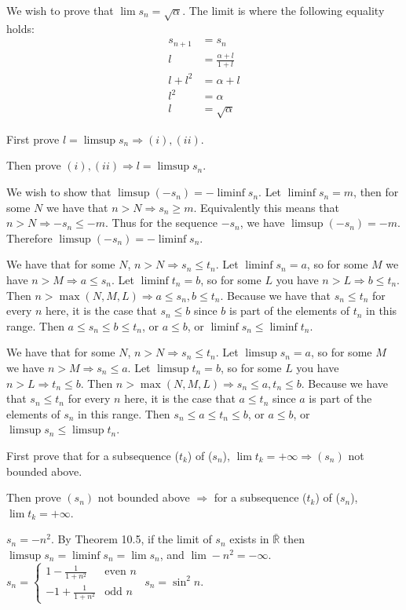 \documentclass{homework}
\begin{document}
\begin{alphaparts}
\questionpart We wish to prove that $\lim s_n = \sqrt{\alpha}$. The limit is where the following equality holds:
\begin{align*}
	s_{n+1} &=  s_n \\
	l       &=  \frac{\alpha + l}{1 + l}    \\
	l + l^2 &=  \alpha + l  \\
	l^2     &=  \alpha  \\
	l   &=  \sqrt{\alpha}
\end{align*}
\end{alphaparts}


\question
First prove $l = \limsup s_n \Rightarrow (i), (ii)$.

Then prove $(i), (ii) \Rightarrow l = \limsup s_n$.

\question
We wish to show that $\limsup (-s_n) = -\liminf s_n$. Let $\liminf s_n = m$, then for some $N$ we have that $n > N \Rightarrow s_n \ge m$. Equivalently this means that $n > N \Rightarrow -s_n \le -m$. Thus for the sequence $-s_n$, we have $\limsup (-s_n) = -m$. Therefore $\limsup (-s_n) = -\liminf s_n$.


\question
We have that for some $N$, $n > N \Rightarrow s_n \le t_n$. Let $\liminf s_n = a$, so for some $M$ we have $n > M \Rightarrow a \le s_n$. Let $\liminf t_n = b$, so for some $L$ you have $n > L \Rightarrow b \le t_n$. Then $n > \max(N, M, L) \Rightarrow a \le s_n, b \le t_n$. Because we have that $s_n \le t_n$ for every $n$ here, it is the case that $s_n \le b$ since $b$ is part of the elements of $t_n$ in this range. Then $a \le s_n \le b \le t_n$, or $a \le b$, or $\liminf s_n \le \liminf t_n$.

We have that for some $N$, $n > N \Rightarrow s_n \le t_n$. Let $\limsup s_n = a$, so for some $M$ we have $n > M \Rightarrow s_n \le a$. Let $\limsup t_n = b$, so for some $L$ you have $n > L \Rightarrow t_n \le b$. Then $n > \max(N, M, L) \Rightarrow s_n \le a, t_n \le b$. Because we have that $s_n \le t_n$ for every $n$ here, it is the case that $a \le t_n$ since $a$ is part of the elements of $s_n$ in this range. Then $s_n \le a \le t_n \le b$, or $a \le b$, or $\limsup s_n \le \limsup t_n$.


\question
First prove that for a subsequence ($t_k$) of ($s_n$), $\lim t_k = +\infty \Rightarrow (s_n)$ not bounded above.

Then prove $(s_n)$ not bounded above $\Rightarrow$ for a subsequence ($t_k$) of ($s_n$), $\lim t_k = +\infty$.


\question
\begin{alphaparts}
	\questionpart $s_n = -n^2$. By Theorem 10.5, if the limit of $s_n$ exists in $\bar{\mathbb{R}}$ then $\limsup s_n = \liminf s_n = \lim s_n$, and $\lim -n^2 = -\infty$.
	\questionpart $s_n = \begin{cases}
		1 - \frac{1}{1+n^2} & \text{even } n \\
		- 1 + \frac{1}{1+n^2} & \text{odd } n
	\end{cases}$
	\questionpart $s_n = \sin^2 n$.
\end{alphaparts}
\end{document}
